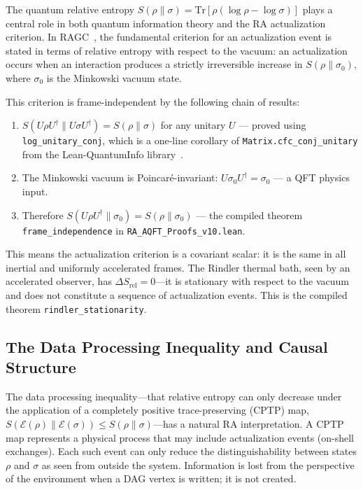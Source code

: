 \documentclass[11pt,a4paper]{article}
\theoremstyle{plain}
\theoremstyle{definition}
\theoremstyle{remark}
\begin{document}
The quantum relative entropy $S(\rho \| \sigma) = \mathrm{Tr}[\rho(\log \rho -
\log \sigma)]$ plays a central role in both quantum information theory and the RA
actualization criterion. In RAGC~\citep{Sandeman2026RAGC}, the fundamental
criterion for an actualization event is stated in terms of relative entropy 
with
respect to the vacuum: an actualization occurs when an interaction produces a
strictly irreversible increase in $S(\rho \| \sigma_0)$, where $\sigma_0$ is the
Minkowski vacuum state.

This criterion is frame-independent by the following chain of results:
\begin{enumerate}[noitemsep]
  \item $S(U\rho U^\dagger \| U\sigma U^\dagger) = S(\rho \| \sigma)$ for any
        unitary $U$ --- proved using \texttt{log\_unitary\_conj}, which is a
        one-line corollary of \texttt{Matrix.cfc\_conj\_unitary} from the
        Lean-QuantumInfo library~\citep{Meiburg2025LQI}.
  \item The Minkowski vacuum is Poincar\'{e}-invariant:
        $U\sigma_0 U^\dagger = \sigma_0$ --- a QFT physics input.
  \item Therefore $S(U\rho U^\dagger \| \sigma_0) = S(\rho \| \sigma_0)$ ---
        the compiled theorem \texttt{frame\_independence} in
        \texttt{RA\_AQFT\_Proofs\_v10.lean}.
\end{enumerate}

This means the actualization criterion is a covariant scalar: it is the same in
all inertial and uniformly accelerated frames. The Rindler thermal bath, seen by
an accelerated observer, has $\Delta S_{\mathrm{rel}} = 0$---it is stationary
with respect to the vacuum and does not constitute a sequence of actualization
events. This is the compiled theorem \texttt{rindler\_stationarity}.

\subsection{The Data Processing Inequality and Causal Structure}

The data processing inequality---that relative entropy can only decrease under the
application of a completely positive trace-preserving (CPTP) map,
$S(\mathcal{E}(\rho) \| \mathcal{E}(\sigma)) \leq S(\rho \| \sigma)$---has a
natural RA interpretation. A CPTP map represents a physical process that may
include actualization events (on-shell exchanges). Each such event can only reduce
the distinguishability between states $\rho$ and $\sigma$ as seen from outside the
system. Information is lost from the perspective of the environment when a DAG
vertex is written; it is not created.
\end{document}
